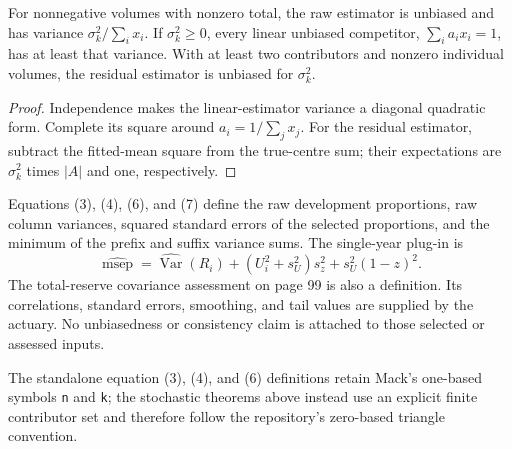 \begin{theorem}\label{thm:bfRaw}\leanok
{}
For nonnegative volumes with nonzero total, the raw estimator is unbiased and
has variance $\sigma_k^2/\sum_i x_i$. If $\sigma_k^2\geq0$, every linear unbiased competitor,
$\sum_i a_i x_i=1$, has at least that variance. With at least two contributors
and nonzero individual volumes, the residual estimator is unbiased for
$\sigma_k^2$.
\end{theorem}
\begin{proof}\leanok Independence makes the linear-estimator variance a
diagonal quadratic form. Complete its square around $a_i=1/\sum_jx_j$. For the
residual estimator, subtract the fitted-mean square from the true-centre sum;
their expectations are $\sigma_k^2$ times $|A|$ and one, respectively.
\end{proof}

\begin{definition}\label{def:bfAssessments}\leanok
Equations (3), (4), (6), and (7) define the raw development proportions, raw
column variances, squared standard errors of the selected proportions, and the
minimum of the prefix and suffix variance sums. The single-year plug-in is
\[
 \widehat{\operatorname{msep}}
 =\widehat{\operatorname{Var}}(R_i)
  +(U_i^2+s_U^2)s_z^2+s_U^2(1-z)^2.
\]
The total-reserve covariance assessment on page 99 is also a definition. Its
correlations, standard errors, smoothing, and tail values are supplied by the
actuary. No unbiasedness or consistency claim is attached to those selected
or assessed inputs.

The standalone equation (3), (4), and (6) definitions retain Mack's one-based
symbols \texttt{n} and \texttt{k}; the stochastic theorems above instead use an explicit
finite contributor set and therefore follow the repository's zero-based
triangle convention.
\end{definition}

